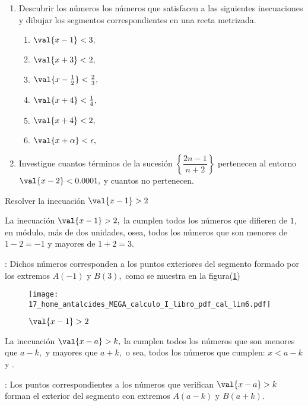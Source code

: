 \begin{ejercicios}[]
\begin{enumerate}
\item Descubrir los números los números que satisfacen a las siguientes
inecuaciones y dibujar los segmentos correspondientes en una recta
metrizada.
\begin{enumerate}
\item $\val{x-1}<3,$
\item $\val{x+3}<2,$
\item $\val{x-\frac{1}{2}}<\frac{2}{3},$
\item $\val{x+4}<\frac{1}{4},$
\item $\val{x+4}<2,$
\item $\val{x+\alpha}<\epsilon,$
\end{enumerate}
\item Investigue cuantos términos de la sucesión $\left\{ \dfrac{2n-1}{n+2}\right\} $
pertenecen al entorno $\val{x-2}<0.0001,$ y cuantos no pertenecen.
\end{enumerate}
\end{ejercicios}

\begin{ejemplo}

Resolver la inecuación $\val{x-1}>2$

\end{ejemplo}

\sol La inecuación $\val{x-1}>2,$ la cumplen todos los números que
difieren de $1,$ en módulo, más de dos unidades, osea, todos los
números que son menores de $1-2=-1$ y mayores de $1+2=3.$

: Dichos números corresponden a los puntos exteriores
del segmento formado por los extremos $A\left(-1\right)$ y $B\left(3\right),$
como se muestra en la figura(\ref{fig:cal_lim6})
\begin{figure}[H]
\centering\texttt{[image: 17\_home\_antalcides\_MEGA\_calculo\_I\_libro\_pdf\_cal\_lim6.pdf]}\caption{$\val{x-1}>2$}\label{fig:cal_lim6}
\end{figure}
\fin

\general La inecuación $\val{x-a}>k,$ la cumplen todos los números
que son menores que $a-k,$ y mayores que $a+k,$ o sea, todos los
números que cumplen: $x<a-k$ y .

\emph{}: Los puntos correspondientes a los números
que verifican $\val{x-a}>k$ forman el exterior del segmento con extremos
$A\left(a-k\right)$ y $B\left(a+k\right).$

